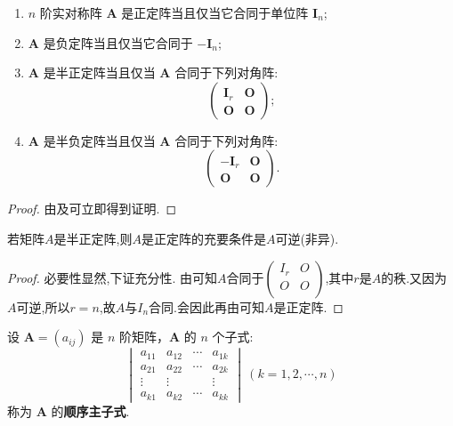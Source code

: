 \documentclass[../../main.tex]{subfiles}
\begin{document}
\begin{theorem}\label{theorem:正定矩阵的充要条件}
\begin{enumerate}[(1)]
\item $n$ 阶实对称阵 $\boldsymbol{A}$ 是正定阵当且仅当它合同于单位阵 $\boldsymbol{I}_n$;

\item $\boldsymbol{A}$ 是负定阵当且仅当它合同于 $-\boldsymbol{I}_n$;

\item $\boldsymbol{A}$ 是半正定阵当且仅当 $\boldsymbol{A}$ 合同于下列对角阵:
\[
\begin{pmatrix}
\boldsymbol{I}_r & \boldsymbol{O}\\
\boldsymbol{O} & \boldsymbol{O}
\end{pmatrix};
\]

\item $\boldsymbol{A}$ 是半负定阵当且仅当 $\boldsymbol{A}$ 合同于下列对角阵:
\[
\begin{pmatrix}
-\boldsymbol{I}_r & \boldsymbol{O}\\
\boldsymbol{O} & \boldsymbol{O}
\end{pmatrix}.
\] 
\end{enumerate}
\end{theorem}
\begin{proof}
由及可立即得到证明.
\end{proof}

\begin{corollary}\label{corollary:可逆的半正定阵必是正定阵}
若矩阵$A$是半正定阵,则$A$是正定阵的充要条件是$A$可逆(非异).
\end{corollary}
\begin{proof}
必要性显然,下证充分性.
由可知$A$合同于$\left( \begin{matrix}
I_r&		O\\
O&		O\\
\end{matrix} \right) $,其中$r$是$A$的秩.又因为$A$可逆,所以$r=n$,故$A$与$I_n$合同.会因此再由可知$A$是正定阵.
\end{proof}

\begin{definition}[顺序主子式]
设 $\boldsymbol{A}=(a_{ij})$ 是 $n$ 阶矩阵，$\boldsymbol{A}$ 的 $n$ 个子式:
\[
\begin{vmatrix}
a_{11} & a_{12} & \cdots & a_{1k}\\
a_{21} & a_{22} & \cdots & a_{2k}\\
\vdots & \vdots & & \vdots\\
a_{k1} & a_{k2} & \cdots & a_{kk}
\end{vmatrix}\ (k = 1,2,\cdots,n)
\]
称为 $\boldsymbol{A}$ 的\textbf{顺序主子式}.
\end{definition}
\end{document}
